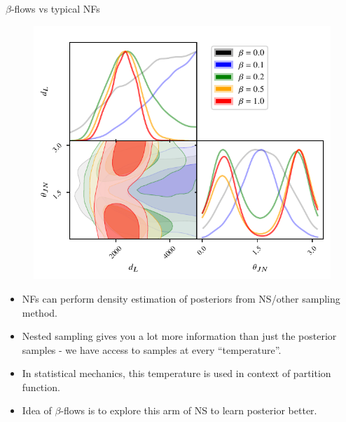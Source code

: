 \documentclass[aspectratio=169]{beamer}
\begin{document}

\begin{frame}{$\beta$-flows vs typical NFs}
    \begin{minipage}[]{0.35\textwidth}
    \vspace{3em}
    \begin{figure}
        \centering
        \includegraphics[width=\textwidth]{Ca_Foscari Beamer/temperature_comparison.pdf}
    \end{figure}
    \end{minipage}\hfill
    \begin{minipage}[]{0.6\textwidth}
    \begin{itemize}
    \item NFs can perform density estimation of posteriors from NS/other sampling method. 
    \item Nested sampling gives you a lot more information than just the posterior samples - we have access to samples at every ``temperature''. 
    \item In statistical mechanics, this temperature is used in context of partition function.
    \item Idea of $\beta$-flows is to explore this arm of NS to learn posterior better. 
    \end{itemize}
    \end{minipage}
\end{frame}
\end{document}
